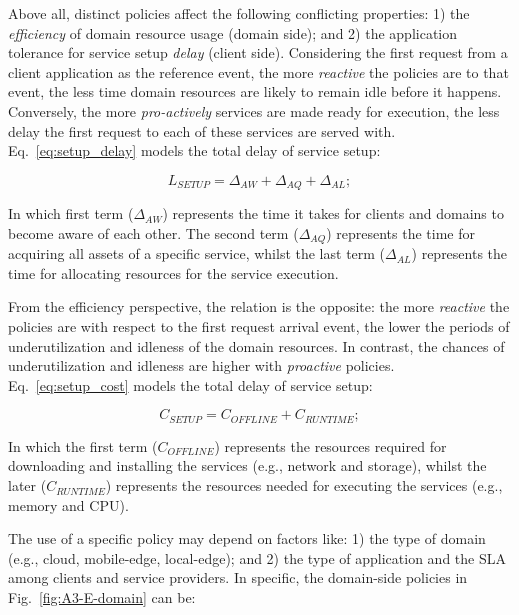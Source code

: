 Above all, distinct policies affect the following conflicting properties: 1) the \textit{efficiency} of domain resource usage (domain side); and 2) the application tolerance for service setup \textit{delay} (client side). Considering the first request from a client application as the reference event, the more \textit{reactive} the policies are to that event, the less time domain resources are likely to remain idle before it happens. Conversely, the more \textit{pro-actively} services are made ready for execution, the less delay the first request to each of these services are served with. Eq.~\ref{eq:setup_delay} models the total delay of service setup:

\begin{equation}\label{eq:setup_delay}
L_{SETUP} = \Delta_{AW} + \Delta_{AQ} + \Delta_{AL};
\end{equation}

\noindent
In which first term ($\Delta_{AW}$) represents the time it takes for clients and domains to become aware of each other. The second term ($\Delta_{AQ}$) represents the time for acquiring all assets of a specific service, whilst the last term ($\Delta_{AL}$) represents the time for allocating resources for the service execution. 

From the efficiency perspective, the relation is the opposite: the more \textit{reactive} the policies are with respect to the first request arrival event, the lower the periods of underutilization and idleness of the domain resources. In contrast, the chances of underutilization and idleness are higher with \textit{proactive} policies. Eq.~\ref{eq:setup_cost} models the total delay of service setup:

\begin{equation}\label{eq:setup_cost}
C_{SETUP} = C_{OFFLINE} + C_{RUNTIME};
\end{equation}

\noindent
In which the first term ($C_{OFFLINE}$) represents the resources required for downloading and installing the services (e.g., network and storage), whilst the later ($C_{RUNTIME}$) represents the resources needed for executing the services (e.g., memory and CPU).

The use of a specific policy may depend on factors like: 1) the type of domain (e.g., cloud, mobile-edge, local-edge); and 2) the type of application and the SLA among clients and service  providers. In specific, the domain-side policies in Fig.~\ref{fig:A3-E-domain} can be:
\medskip
\medskip

